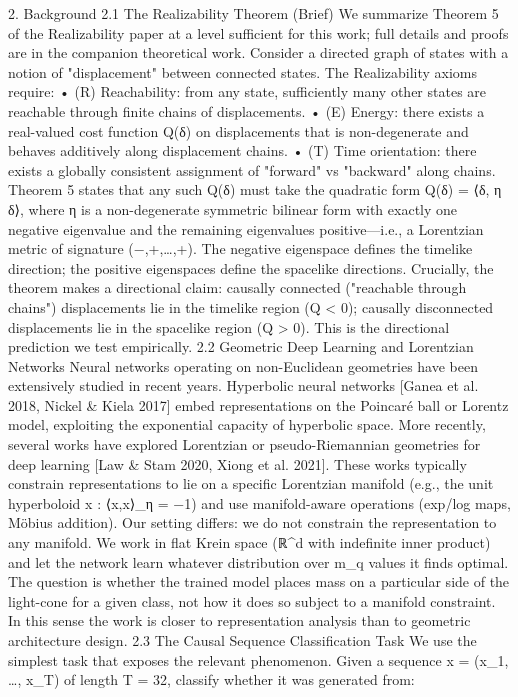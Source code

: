 2. Background
2.1 The Realizability Theorem (Brief)
We summarize Theorem 5 of the Realizability paper at a level sufficient for this work; full details and proofs are in the companion theoretical work.
Consider a directed graph of states with a notion of "displacement" between connected states. The Realizability axioms require:
	•	(R) Reachability: from any state, sufficiently many other states are reachable through finite chains of displacements.
	•	(E) Energy: there exists a real-valued cost function Q(δ) on displacements that is non-degenerate and behaves additively along displacement chains.
	•	(T) Time orientation: there exists a globally consistent assignment of "forward" vs "backward" along chains.
Theorem 5 states that any such Q(δ) must take the quadratic form Q(δ) = ⟨δ, η δ⟩, where η is a non-degenerate symmetric bilinear form with exactly one negative eigenvalue and the remaining eigenvalues positive—i.e., a Lorentzian metric of signature (−,+,…,+). The negative eigenspace defines the timelike direction; the positive eigenspaces define the spacelike directions.
Crucially, the theorem makes a directional claim: causally connected ("reachable through chains") displacements lie in the timelike region (Q < 0); causally disconnected displacements lie in the spacelike region (Q > 0). This is the directional prediction we test empirically.
2.2 Geometric Deep Learning and Lorentzian Networks
Neural networks operating on non-Euclidean geometries have been extensively studied in recent years. Hyperbolic neural networks [Ganea et al. 2018, Nickel & Kiela 2017] embed representations on the Poincaré ball or Lorentz model, exploiting the exponential capacity of hyperbolic space. More recently, several works have explored Lorentzian or pseudo-Riemannian geometries for deep learning [Law & Stam 2020, Xiong et al. 2021]. These works typically constrain representations to lie on a specific Lorentzian manifold (e.g., the unit hyperboloid {x : ⟨x,x⟩_η = −1}) and use manifold-aware operations (exp/log maps, Möbius addition).
Our setting differs: we do not constrain the representation to any manifold. We work in flat Krein space (ℝ^d with indefinite inner product) and let the network learn whatever distribution over m_q values it finds optimal. The question is whether the trained model places mass on a particular side of the light-cone for a given class, not how it does so subject to a manifold constraint. In this sense the work is closer to representation analysis than to geometric architecture design.
2.3 The Causal Sequence Classification Task
We use the simplest task that exposes the relevant phenomenon. Given a sequence x = (x_1, …, x_T) of length T = 32, classify whether it was generated from:
